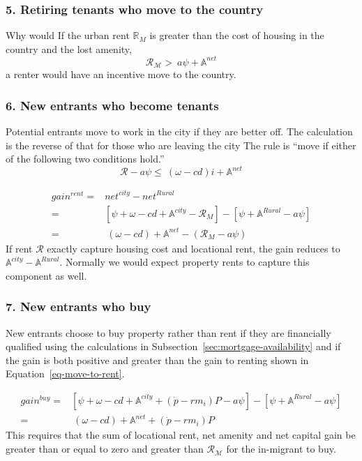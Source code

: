 \subsubsection{5. Retiring tenants who  move to the country} 
Why would  If the urban rent $\mathbb{R}_M$ is greater than the cost of housing in the country and the lost amenity, 
\[\mathcal{R_M} > \ a\psi+ \mathbb{A}^{net}\]
a renter would have an incentive move to the country.



\subsubsection{6. New entrants who become tenants}
Potential entrants move to work in the city if they are better off. The calculation is  the reverse of that for those who are leaving the city
The rule is ``move if either of the following two conditions hold.''
\[\mathcal{R}-a\psi \le\ (\omega-cd) i+ \mathbb{A}^{net}\]

\begin{align}
gain^{rent}=&net^{city}-net^{Rural}\nonumber\\
=&\left[\psi+\omega-cd+\mathbb{A}^{city}-\mathcal{R}_M\right]-\left[\psi+\mathbb{A}^{Rural}-a\psi\right] \nonumber\\
=&\ (\omega-cd) +\mathbb{A}^{net} -(\mathcal{R}_M-a\psi)
\label{eq-move-to-rent}
\end{align}
If rent $\mathcal{R}$ exactly capture housing cost and locational rent, the gain reduces to $\mathbb{A}^{city}-\mathbb{A}^{Rural}$. Normally we would expect property rents to capture this component  as well. 

\subsubsection{7. New entrants who buy}
New entrants choose to buy property rather than rent  if they are financially qualified using the calculations in Subsection~\ref{sec:mortgage-availability} and if the gain is both positive and greater than the gain to renting shown in 
Equation~\ref{eq-move-to-rent}.

\begin{align}
gain^{buy}=&\left[\psi+\omega-cd+\mathbb{A}^{city}+(\dot p-{r}m_i)P-a\psi\right]-\left[\psi+\mathbb{A}^{Rural}-a\psi\right] \nonumber\\
=&\ (\omega-cd)+\mathbb{A}^{net}+(\dot p-{r}m_i)P  \label{eq-move-to-buy}
\end{align}
This requires that the sum of  locational rent, net amenity and net capital gain be greater than or equal to zero and greater than $\mathcal{R_M}$ for the in-migrant to buy.

